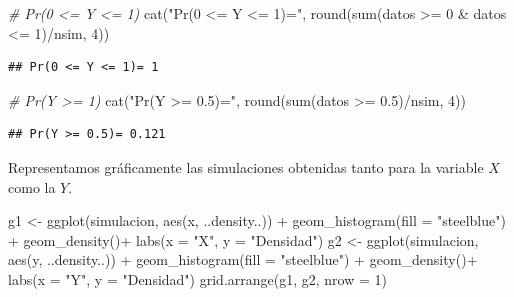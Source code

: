 \documentclass[
]{book}
\newenvironment{Shaded}{\begin{snugshade}}{\end{snugshade}}
\newcommand{\AttributeTok}[1]{\textcolor[rgb]{0.77,0.63,0.00}{#1}}
\newcommand{\CommentTok}[1]{\textcolor[rgb]{0.56,0.35,0.01}{\textit{#1}}}
\newcommand{\DecValTok}[1]{\textcolor[rgb]{0.00,0.00,0.81}{#1}}
\newcommand{\FloatTok}[1]{\textcolor[rgb]{0.00,0.00,0.81}{#1}}
\newcommand{\FunctionTok}[1]{\textcolor[rgb]{0.00,0.00,0.00}{#1}}
\newcommand{\NormalTok}[1]{#1}
\newcommand{\OtherTok}[1]{\textcolor[rgb]{0.56,0.35,0.01}{#1}}
\newcommand{\SpecialCharTok}[1]{\textcolor[rgb]{0.00,0.00,0.00}{#1}}
\newcommand{\StringTok}[1]{\textcolor[rgb]{0.31,0.60,0.02}{#1}}
\theoremstyle{definition}
\theoremstyle{definition}
\theoremstyle{definition}
\theoremstyle{definition}
\theoremstyle{remark}
\begin{document}
\begin{Shaded}
\begin{Highlighting}[]
\CommentTok{\# Pr(0 \textless{}= Y \textless{}= 1) }
\FunctionTok{cat}\NormalTok{(}\StringTok{"Pr(0 \textless{}= Y \textless{}= 1)="}\NormalTok{, }\FunctionTok{round}\NormalTok{(}\FunctionTok{sum}\NormalTok{(datos }\SpecialCharTok{\textgreater{}=} \DecValTok{0} \SpecialCharTok{\&}\NormalTok{ datos }\SpecialCharTok{\textless{}=} \DecValTok{1}\NormalTok{)}\SpecialCharTok{/}\NormalTok{nsim, }\DecValTok{4}\NormalTok{))}
\end{Highlighting}
\end{Shaded}

\begin{verbatim}
## Pr(0 <= Y <= 1)= 1
\end{verbatim}

\begin{Shaded}
\begin{Highlighting}[]
\CommentTok{\# Pr(Y \textgreater{}= 1) }
\FunctionTok{cat}\NormalTok{(}\StringTok{"Pr(Y \textgreater{}= 0.5)="}\NormalTok{, }\FunctionTok{round}\NormalTok{(}\FunctionTok{sum}\NormalTok{(datos }\SpecialCharTok{\textgreater{}=} \FloatTok{0.5}\NormalTok{)}\SpecialCharTok{/}\NormalTok{nsim, }\DecValTok{4}\NormalTok{))}
\end{Highlighting}
\end{Shaded}

\begin{verbatim}
## Pr(Y >= 0.5)= 0.121
\end{verbatim}

Representamos gráficamente las simulaciones obtenidas tanto para la variable \(X\) como la \(Y\).

\begin{Shaded}
\begin{Highlighting}[]
\NormalTok{g1 }\OtherTok{\textless{}{-}} \FunctionTok{ggplot}\NormalTok{(simulacion, }\FunctionTok{aes}\NormalTok{(x, ..density..)) }\SpecialCharTok{+} 
  \FunctionTok{geom\_histogram}\NormalTok{(}\AttributeTok{fill =} \StringTok{"steelblue"}\NormalTok{) }\SpecialCharTok{+}
  \FunctionTok{geom\_density}\NormalTok{()}\SpecialCharTok{+}
  \FunctionTok{labs}\NormalTok{(}\AttributeTok{x =} \StringTok{"X"}\NormalTok{, }\AttributeTok{y =} \StringTok{"Densidad"}\NormalTok{)}
\NormalTok{g2 }\OtherTok{\textless{}{-}} \FunctionTok{ggplot}\NormalTok{(simulacion, }\FunctionTok{aes}\NormalTok{(y, ..density..)) }\SpecialCharTok{+} 
  \FunctionTok{geom\_histogram}\NormalTok{(}\AttributeTok{fill =} \StringTok{"steelblue"}\NormalTok{) }\SpecialCharTok{+}
  \FunctionTok{geom\_density}\NormalTok{()}\SpecialCharTok{+}
  \FunctionTok{labs}\NormalTok{(}\AttributeTok{x =} \StringTok{"Y"}\NormalTok{, }\AttributeTok{y =} \StringTok{"Densidad"}\NormalTok{)}
\FunctionTok{grid.arrange}\NormalTok{(g1, g2, }\AttributeTok{nrow =} \DecValTok{1}\NormalTok{)}
\end{Highlighting}
\end{Shaded}
\end{document}
